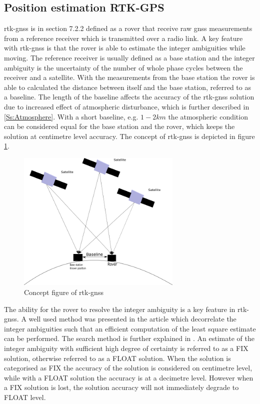 \subsection{Position estimation RTK-GPS}\label{ss:rtk-gps}
\acrfull{rtk-gnss} is in \citep{misra2011global} section 7.2.2 defined as a rover that receive raw \gls{gnss} measurements from a reference receiver which is transmitted over a radio link. A key feature with \gls{rtk-gnss} is that the rover is able to estimate the integer ambiguities while moving. The reference receiver is usually defined as a base station and the integer ambiguity is the uncertainty of the number of whole phase cycles between the receiver and a satellite. With the measurements from the base station the rover is able to calculated the distance between itself and the base station, referred to as a baseline. The length of the baseline affects the accuracy of the \gls{rtk-gnss} solution due to increased effect of atmospheric disturbance, which is further described in \ref{Ss:Atmosphere}. With a short baseline, e.g. $1-2 km$ the atmospheric condition can be considered equal for the base station and the rover, which keeps the solution  at centimetre level accuracy. The concept of \gls{rtk-gnss} is depicted in figure \ref{figure:RTK}.
\begin{figure}[H]
	\centering
		\includegraphics[width=0.7\textwidth]{figs/DGPS.png}
		\caption{Concept figure of \acrfull{rtk-gnss}}
		\label{figure:RTK}
\end{figure}
The ability for the rover to resolve the integer ambiguity is a key feature in \gls{rtk-gnss}. A well used method was presented in the article \citep{teunissen1994new} which decorrelate the integer ambiguities such that an efficient computation of the least square estimate can be performed. The search method is further explained in \citep{teunissen1995least}. An estimate of the integer ambiguity with sufficient high degree of certainty is referred to as a FIX solution, otherwise referred to as a FLOAT solution. When the solution is categorised as FIX the accuracy of the solution is considered on centimetre level, while with a FLOAT solution the accuracy is at a decimetre level. However when a FIX solution is lost, the solution accuracy will not immediately degrade to FLOAT level.

